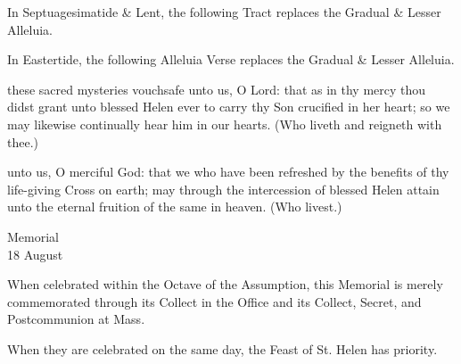 \begin{rubric}
	In Septuagesimatide \& Lent, the following Tract replaces the Gradual \& Lesser Alleluia.
\end{rubric}

\begin{rubric}
	In Eastertide, the following Alleluia Verse replaces the Gradual \& Lesser Alleluia.
\end{rubric}


\secret
{} these sacred mysteries vouchsafe unto us, O Lord: that as in thy mercy thou didst grant unto blessed Helen ever to carry thy Son crucified in her heart; so we may likewise continually hear him in our hearts. (Who liveth and reigneth with thee.)


\postcommunion
{} unto us, O merciful God: that we who have been refreshed by the benefits of thy life-giving Cross on earth; may through the intercession of blessed Helen attain unto the eternal fruition of the same in heaven. (Who livest.)

\begin{inhead}
    {Memorial\\
18 August}
\end{inhead}
\begin{rubric}
	When celebrated within the Octave of the Assumption, this Memorial is merely commemorated through its Collect in the Office and its Collect, Secret, and Postcommunion at Mass.\par
	When they are celebrated on the same day, the Feast of St. Helen has priority.
\end{rubric}

